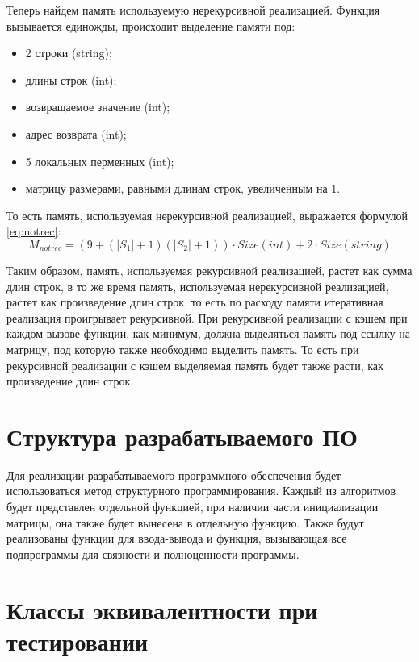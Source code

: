 Теперь найдем память используемую нерекурсивной реализацией. Функция вызывается
единожды, происходит выделение памяти под:
\begin{itemize}
    \item 2 строки (string);
    \item длины строк (int);
    \item возвращаемое значение (int);
    \item адрес возврата (int);
    \item 5 локальных перменных (int);
    \item матрицу размерами, равными длинам строк, увеличенным на 1.
\end{itemize}

То есть память, используемая нерекурсивной реализацией, выражается формулой
\ref{eq:notrec}:
\begin{equation}\label{eq:notrec}
    M_{notrec} = (9 + (|S_1| + 1)(|S_2| + 1)) \cdot Size(int)
                 + 2 \cdot Size(string)
\end{equation}

Таким образом, память, используемая рекурсивной реализацией, растет как сумма
длин строк, в то же время память, используемая нерекурсивной реализацией,
растет как произведение длин строк, то есть по расходу памяти итеративная
реализация проигрывает рекурсивной. При рекурсивной реализации с кэшем при
каждом вызове функции, как минимум, должна выделяться память под ссылку на
матрицу, под которую также необходимо выделить память. То есть при рекурсивной
реализации с кэшем выделяемая память будет также расти, как произведение длин
строк.

\section{Структура разрабатываемого ПО}

Для реализации разрабатываемого программного обеспечения будет использоваться
метод структурного программирования. Каждый из алгоритмов будет представлен
отдельной функцией, при наличии части инициализации матрицы, она также будет
вынесена в отдельную функцию. Также будут реализованы функции для ввода-вывода
и функция, вызывающая все подпрограммы для связности и полноценности
программы.

\section{Классы эквивалентности при тестировании}

